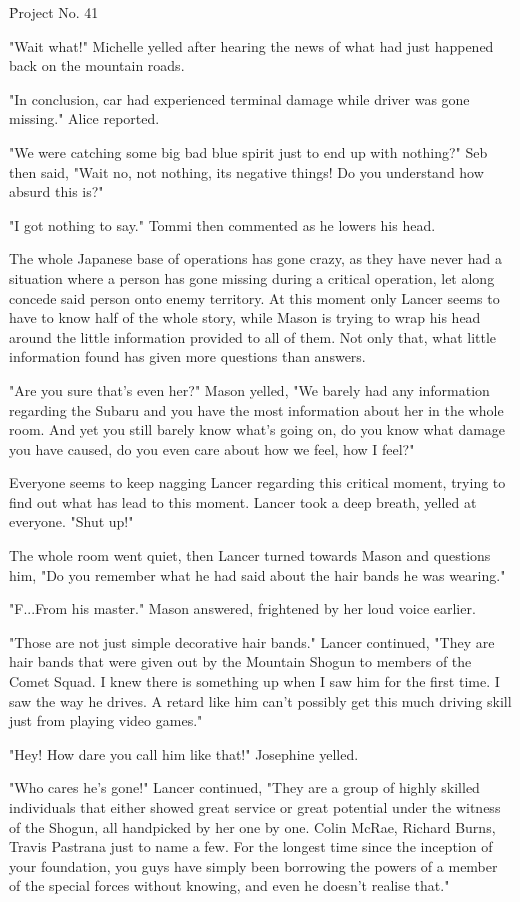 \h{Project No. 41}

"Wait what!" Michelle yelled after hearing the news of what had just happened back on the mountain roads. 

"In conclusion, car had experienced terminal damage while driver was gone missing." Alice reported. 

"We were catching some big bad blue spirit just to end up with nothing?" Seb then said, "Wait no, not nothing, its negative things! Do you understand how absurd this is?"

"I got nothing to say." Tommi then commented as he lowers his head. 

The whole Japanese base of operations has gone crazy, as they have never had a situation where a person has gone missing during a critical operation, let along concede said person onto enemy territory. At this moment only Lancer seems to have to know half of the whole story, while Mason is trying to wrap his head around the little information provided to all of them. Not only that, what little information found has given more questions than answers. 

"Are you sure that's even her?" Mason yelled, "We barely had any information regarding the Subaru and you have the most information about her in the whole room. And yet you still barely know what's going on, do you know what damage you have caused, do you even care about how we feel, how I feel?"

Everyone seems to keep nagging Lancer regarding this critical moment, trying to find out what has lead to this moment. Lancer took a deep breath, yelled at everyone. "Shut up!"

The whole room went quiet, then Lancer turned towards Mason and questions him, "Do you remember what he had said about the hair bands he was wearing."

"F...From his master." Mason answered, frightened by her loud voice earlier. 

"Those are not just simple decorative hair bands." Lancer continued, "They are hair bands that were given out by the Mountain Shogun to members of the Comet Squad. I knew there is something up when I saw him for the first time. I saw the way he drives. A retard like him can't possibly get this much driving skill just from playing video games."

"Hey! How dare you call him like that!" Josephine yelled. 

"Who cares he's gone!" Lancer continued, "They are a group of highly skilled individuals that either showed great service or great potential under the witness of the Shogun, all handpicked by her one by one. Colin McRae, Richard Burns, Travis Pastrana just to name a few. For the longest time since the inception of your foundation, you guys have simply been borrowing the powers of a member of the special forces without knowing, and even he doesn't realise that."

